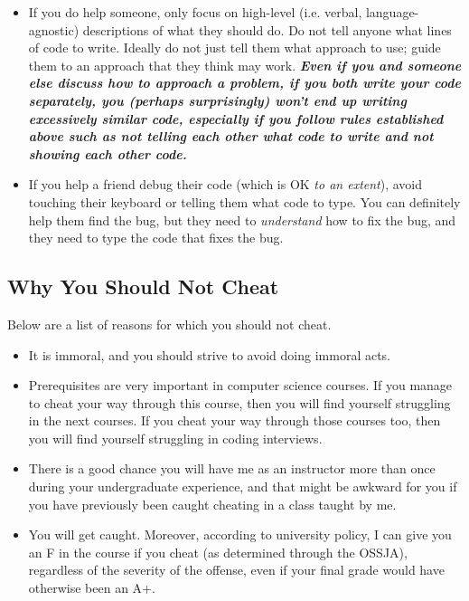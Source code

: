 \documentclass{article}
\begin{document}
\begin{itemize}[itemsep=0mm, parsep=0pt]
\begin{itemize}[itemsep=0mm, parsep=0pt]
    \end{itemize}
\item If you do help someone, only focus on high-level (i.e. verbal, language-agnostic) descriptions of what they should do. Do not tell anyone what lines of code to write. Ideally do not just tell them what approach to use; guide them to an approach that they think may work. \textbf{\textit{Even if you and someone else discuss how to approach a problem, if you both write your code separately, you (perhaps surprisingly) won't end up writing excessively similar code, especially if you follow rules established above such as not telling each other what code to write and not showing each other code.}}
\item If you help a friend debug their code (which is OK \textit{to an extent}), avoid touching their keyboard or telling them what code to type. You can definitely help them find the bug, but they need to \textit{understand} how to fix the bug, and they need to type the code that fixes the bug.
\end{itemize}

\subsection{Why You Should Not Cheat}

Below are a list of reasons for which you should not cheat.

\begin{itemize}[itemsep=0mm, parsep=0pt]
\item It is immoral, and you should strive to avoid doing immoral acts.
\item Prerequisites are very important in computer science courses. If you manage to cheat your way through this course, then you will find yourself struggling in the next courses. If you cheat your way through those courses too, then you will find yourself struggling in coding interviews.
\item There is a good chance you will have me as an instructor more than once during your undergraduate experience, and that might be awkward for you if you have previously been caught cheating in a class taught by me.
\item You will get caught. Moreover, according to university policy, I can give you an F in the course if you cheat (as determined through the OSSJA), regardless of the severity of the offense, even if your final grade would have otherwise been an A+.
\end{itemize}
\end{document}
